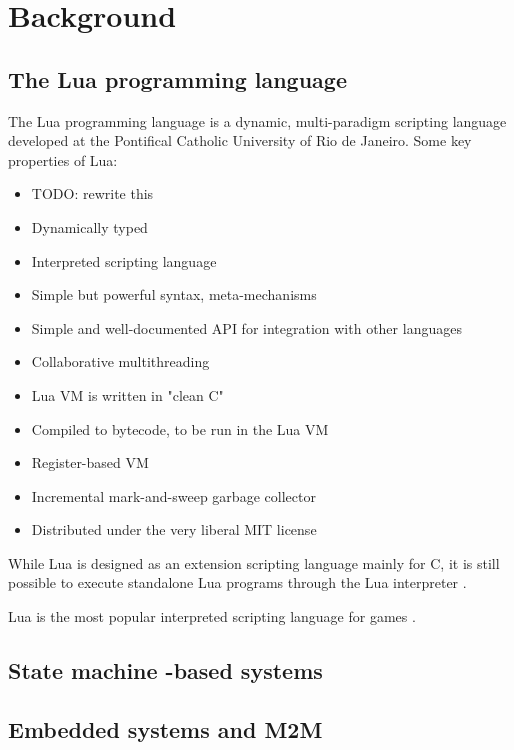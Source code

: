 \chapter{Background}
\label{chp:background}

\section{The Lua programming language}
\label{sec:lua_language}

The Lua programming language is a dynamic, multi-paradigm scripting language developed at the Pontifical Catholic University of Rio de Janeiro. Some key properties of Lua:

\begin{itemize}
	\item TODO: rewrite this
	\item Dynamically typed
	\item Interpreted scripting language
	\item Simple but powerful syntax, meta-mechanisms
	\item Simple and well-documented API for integration with other languages
	\item Collaborative multithreading
	\item Lua VM is written in "clean C"
	\item Compiled to bytecode, to be run in the Lua VM
	\item Register-based VM
	\item Incremental mark-and-sweep garbage collector
	\item Distributed under the very liberal MIT license \cite{website:lua_license}
\end{itemize}

While Lua is designed as an extension scripting language mainly for C, it is still possible to execute standalone Lua programs through the Lua interpreter \cite[ch. 7]{book:lua_reference_manual}.

Lua is the most popular interpreted scripting language for games \cite{website:the_engine_survey}.

\section{State machine -based systems}


\section{Embedded systems and M2M}